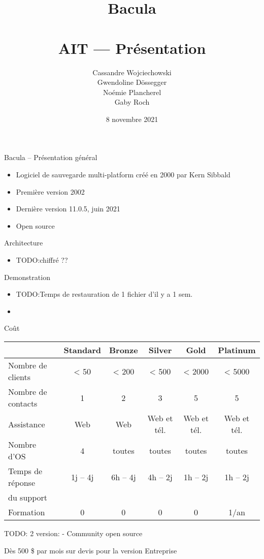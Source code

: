 \documentclass[aspectratio=169]{beamer}
\title{Bacula\\~\\AIT --- Présentation}
\author{Cassandre Wojciechowski \\ Gwendoline Dössegger \\ Noémie Plancherel \\ Gaby Roch}
\date{8 novembre 2021}
\newcommand{\TODO}{TODO:}
\begin{document}
\begin{frame}
  \titlepage
\end{frame}

\begin{frame}{Bacula -- Présentation général}
 \begin{itemize}
  \item Logiciel de sauvegarde multi-platform créé en 2000 par Kern Sibbald
  \item Première version 2002
  \item Dernière version 11.0.5, juin 2021
  \item Open source
 \end{itemize}
\end{frame}

\begin{frame}{Architecture}
 \begin{itemize}
  \item \TODO chiffré ??
 \end{itemize}
\end{frame}

\begin{frame}{Demonstration}
 \begin{itemize}
  \item \TODO Temps de restauration de 1 fichier d'il y a 1 sem.
  \item 
 \end{itemize}
\end{frame}

\begin{frame}{Coût}
\begin{center}

 \begin{tabular}{|l|ccccc|}
    \hline
    & Standard & Bronze & Silver & Gold & Platinum \\
    \hline
    \hline
    Nombre de clients & < 50 & < 200 & < 500 & < 2000 & < 5000 \\
    \hline
    Nombre de contacts & 1 & 2 & 3 & 5 & 5 \\
    \hline
    Assistance & Web & Web & Web et tél.& Web et tél. & Web et tél. \\
    \hline
    Nombre d'OS & 4 & toutes & toutes & toutes & toutes \\
    \hline
    Temps de réponse & 1j -- 4j & 6h -- 4j & 4h -- 2j & 1h -- 2j & 1h -- 2j \\
    du support &  \\
    \hline
    Formation & 0 & 0 & 0 & 0 & 1/an \\
    \hline
 \end{tabular}
\end{center}

\TODO
2 version: - Community open source

Dès 500 \$ par mois sur devis pour la version Entreprise
\end{frame}
\end{document}

